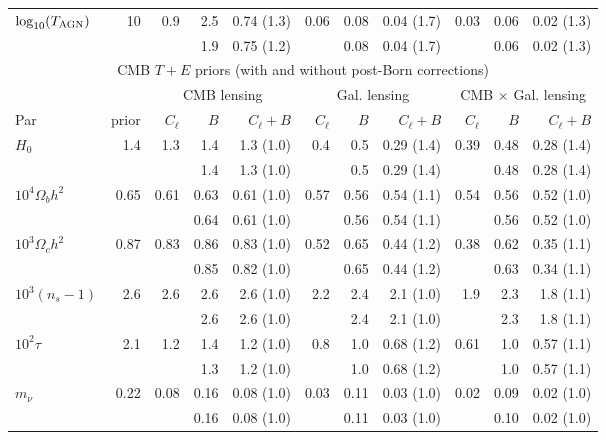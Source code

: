\documentclass[11pt]{article} %
\begin{document}
\begin{table}
\begin{tabular}{|l|r|rrr|rrr|rrr|}
$\log_{10}(T_{\rm AGN})$ & 10 & 0.9 & 2.5 & 0.74 (1.3) & 0.06 & 0.08 & 0.04 (1.7) & 0.03 & 0.06 & 0.02 (1.3)\\
\rowcolor{blue!10}
 & & & 1.9 & 0.75 (1.2) & & 0.08 & 0.04 (1.7) & & 0.06 & 0.02 (1.3) \\

\hline
\multicolumn{11}{|c|}{CMB $T+E$ priors (with and without post-Born corrections)}\\
\hline
&& \multicolumn{3}{c|}{CMB lensing} & \multicolumn{3}{c|}{Gal. lensing} & \multicolumn{3}{c|}{CMB $\times$ Gal. lensing}\\
\hline
Par & prior & $C_\ell$ & $B$ & $C_\ell+B$ & $C_\ell$ & $B$ & $C_\ell+B$ & $C_\ell$ & $B$ & $C_\ell+B$\\
\hline
$H_0$ & 1.4 & 1.3 & 1.4 & 1.3 (1.0) & 0.4 & 0.5 & 0.29 (1.4) & 0.39 & 0.48 & 0.28 (1.4)\\
\rowcolor{blue!10}
 & & & 1.4 & 1.3 (1.0) & & 0.5 & 0.29 (1.4) & & 0.48 & 0.28 (1.4) \\

$10^4\Omega_b h^2$ & 0.65 & 0.61 & 0.63 & 0.61 (1.0) & 0.57 & 0.56 & 0.54 (1.1) & 0.54 & 0.56 & 0.52 (1.0)\\
\rowcolor{blue!10}
 & & & 0.64 & 0.61 (1.0) & & 0.56 & 0.54 (1.1) & & 0.56 & 0.52 (1.0) \\

$10^3\Omega_c h^2$ & 0.87 & 0.83 & 0.86 & 0.83 (1.0) & 0.52 & 0.65 & 0.44 (1.2) & 0.38 & 0.62 & 0.35 (1.1)\\
\rowcolor{blue!10}
 & & & 0.85 & 0.82 (1.0) & & 0.65 & 0.44 (1.2) & & 0.63 & 0.34 (1.1) \\

$10^3(n_s-1)$ & 2.6 & 2.6 & 2.6 & 2.6 (1.0) & 2.2 & 2.4 & 2.1 (1.0) & 1.9 & 2.3 & 1.8 (1.1)\\
\rowcolor{blue!10}
 & & & 2.6 & 2.6 (1.0) & & 2.4 & 2.1 (1.0) & & 2.3 & 1.8 (1.1) \\

$10^2\tau$ & 2.1 & 1.2 & 1.4 & 1.2 (1.0) & 0.8 & 1.0 & 0.68 (1.2) & 0.61 & 1.0 & 0.57 (1.1)\\
\rowcolor{blue!10}
 & & & 1.3 & 1.2 (1.0) & & 1.0 & 0.68 (1.2) & & 1.0 & 0.57 (1.1) \\

$m_\nu$ & 0.22 & 0.08 & 0.16 & 0.08 (1.0) & 0.03 & 0.11 & 0.03 (1.0) & 0.02 & 0.09 & 0.02 (1.0)\\
\rowcolor{blue!10}
 & & & 0.16 & 0.08 (1.0) & & 0.11 & 0.03 (1.0) & & 0.10 & 0.02 (1.0) \\


\end{tabular}
\end{table}
\end{document}
